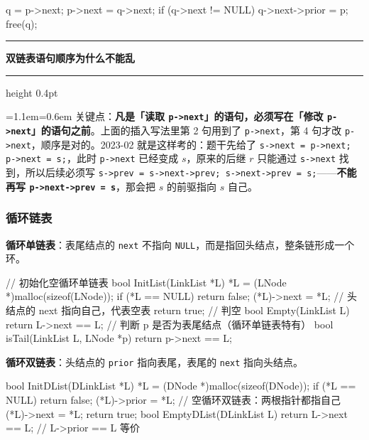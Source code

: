 \documentclass[11pt,openany,UTF8]{ctexbook}
\newcommand{\callouthead}[2]{%
  \par\addvspace{7pt}\noindent
  {\color{#1}\rule[-0.15em]{3pt}{1.05em}}\hspace{0.5em}%
  {\bfseries\color{#1}#2}\par\nobreak\vspace{-0.35em}%
  {\color{rulesep}\hrule height 0.4pt}\nobreak\vspace{0.45em}%
  \begingroup\small\setlength{\parindent}{0pt}%
  \leftskip=1.1em\rightskip=0.6em\noindent\ignorespaces}
\newcommand{\calloutend}{\par\endgroup\addvspace{7pt}}
\newenvironment{callwarn}[1]{\callouthead{warnbar}{#1}}{\calloutend}
\begin{document}
\begin{codebox}
q = p->next;
p->next = q->next;
if (q->next != NULL)
    q->next->prior = p;
free(q);
\end{codebox}

\begin{callwarn}{双链表语句顺序为什么不能乱}
关键点：\textbf{凡是「读取 \texttt{p->\allowbreak{}next}」的语句，必须写在「修改 \texttt{p->\allowbreak{}next}」的语句之前}。上面的插入写法里第 2 句用到了 \texttt{p->\allowbreak{}next}，第 4 句才改 \texttt{p->\allowbreak{}next}，顺序是对的。2023-02 就是这样考的：题干先给了 \texttt{s->\allowbreak{}next =\allowbreak{} p->\allowbreak{}next;\allowbreak{} p->\allowbreak{}next =\allowbreak{} s;\allowbreak{}}，此时 \texttt{p->\allowbreak{}next} 已经变成 $s$，原来的后继 $r$ 只能通过 \texttt{s->\allowbreak{}next} 找到，所以后续必须写 \texttt{s->\allowbreak{}prev =\allowbreak{} s->\allowbreak{}next->\allowbreak{}prev;\allowbreak{} s->\allowbreak{}next->\allowbreak{}prev =\allowbreak{} s;\allowbreak{}}——\textbf{不能再写 \texttt{p->\allowbreak{}next->\allowbreak{}prev =\allowbreak{} s}}，那会把 $s$ 的前驱指向 $s$ 自己。

\end{callwarn}

\subsubsection{循环链表}

\textbf{循环单链表}：表尾结点的 \texttt{next} 不指向 \texttt{NULL}，而是指回头结点，整条链形成一个环。

\begin{codebox}
// 初始化空循环单链表
bool InitList(LinkList *L) {
    *L = (LNode *)malloc(sizeof(LNode));
    if (*L == NULL) return false;
    (*L)->next = *L;        // 头结点的 next 指向自己，代表空表
    return true;
}
// 判空
bool Empty(LinkList L) { return L->next == L; }
// 判断 p 是否为表尾结点（循环单链表特有）
bool isTail(LinkList L, LNode *p) { return p->next == L; }
\end{codebox}

\textbf{循环双链表}：头结点的 \texttt{prior} 指向表尾，表尾的 \texttt{next} 指向头结点。

\begin{codebox}
bool InitDList(DLinkList *L) {
    *L = (DNode *)malloc(sizeof(DNode));
    if (*L == NULL) return false;
    (*L)->prior = *L;      // 空循环双链表：两根指针都指自己
    (*L)->next  = *L;
    return true;
}
bool EmptyDList(DLinkList L) { return L->next == L; }  // L->prior == L 等价
\end{codebox}
\end{document}

